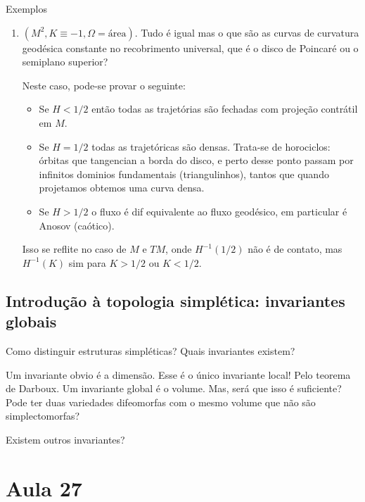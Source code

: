 \begin{thing4}{Exemplos}
\begin{enumerate}
Agora lembre que o fibrado unitário do toro é trivial
\[\begin{tikzcd}
ST^2=S^1 \times T^2\arrow[d]\\
T^2
\end{tikzcd}\]
é isso mostra que não temos uma superfície de contato, já que a forma de volume não é exata, assim que o seu pullback não pode ser exata---as superfícies de contato precisam formas exatas.

\item $(M^2,K\equiv-1,\Omega=\text{área} )$. Tudo é igual mas o que são as curvas de curvatura geodésica constante no recobrimento universal, que é o disco de Poincaré ou o semiplano superior?

Neste caso, pode-se provar o seguinte:
\begin{itemize}
\item Se $H<1/2$ então todas as trajetórias  são fechadas com projeção contrátil em $M$.
\item Se $H=1/2$ todas as trajetóricas são densas. Trata-se de horociclos: órbitas que tangencian a borda do disco, e perto desse ponto passam por infinitos dominios fundamentais (triangulinhos), tantos que quando projetamos obtemos uma curva densa.
\item Se $H>1/2$ o fluxo  é dif equivalente ao fluxo geodésico, em particular é Anosov (caótico).
\end{itemize}
\begin{remark}\leavevmode
	Isso se reflite no caso de $M$ e $TM$, onde  $H^{-1}(1/2)$ não é de contato, mas $H^{-1}(K)$ sim para $K>1/2$ ou $K<1/2$.
\end{remark}
\end{enumerate}
\end{thing4}

\subsection{Introdução à topologia simplética: invariantes globais}

\begin{question}\leavevmode
Como distinguir estruturas simpléticas? Quais invariantes existem?
\end{question}

Um invariante obvio é a dimensão. Esse é o único invariante local! Pelo teorema de Darboux. Um invariante global é o volume. Mas, será que isso é suficiente? Pode ter duas variedades difeomorfas com o mesmo volume que não são simplectomorfas?

\begin{question}\leavevmode
	Existem outros invariantes?
\end{question}


\section{Aula 27}



